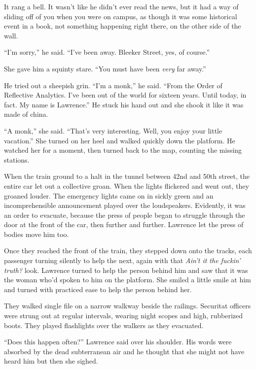 It rang a bell. It wasn't like he didn't ever read the news, but it had 
a way of sliding off of you when you were on campus, as though it was 
some historical event in a book, not something happening right there, 
on the other side of the wall.

“I'm sorry,” he said. “I've been away. Bleeker Street, yes, of 
course.”

She gave him a squinty stare. “You must have been \emph{very} far 
away.”

He tried out a sheepish grin. “I'm a monk,” he said. “From the 
Order of Reflective Analytics. I've been out of the world for sixteen 
years. Until today, in fact. My name is Lawrence.” He stuck his hand 
out and she shook it like it was made of china.

“A monk,” she said. “That's very interesting. Well, you enjoy 
your little vacation.” She turned on her heel and walked quickly down 
the platform. He watched her for a moment, then turned back to the map, 
counting the missing stations.

\tb

When the train ground to a halt in the tunnel between 42nd and 50th 
street, the entire car let out a collective groan. When the lights 
flickered and went out, they groaned louder. The emergency lights came 
on in sickly green and an incomprehensible announcement played over the 
loudspeakers. Evidently, it was an order to evacuate, because the press 
of people began to struggle through the door at the front of the car, 
then further and further. Lawrence let the press of bodies move him too.

Once they reached the front of the train, they stepped down onto the 
tracks, each passenger turning silently to help the next, again with 
that \emph{Ain't it the fuckin' truth?} look. Lawrence turned to help 
the person behind him and saw that it was the woman who'd spoken to him 
on the platform. She smiled a little smile at him and turned with 
practiced ease to help the person behind her.

They walked single file on a narrow walkway beside the railings. 
Securitat officers were strung out at regular intervals, wearing night 
scopes and high, rubberized boots. They played flashlights over the 
walkers as they evacuated.

“Does this happen often?” Lawrence said over his shoulder. His 
words were absorbed by the dead subterranean air and he thought that 
she might not have heard him but then she sighed.


